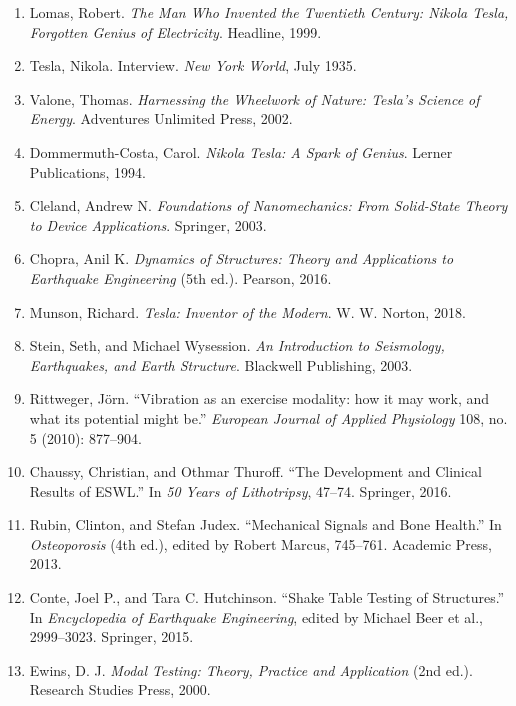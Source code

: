 \documentclass[12pt,a4paper]{article}
\begin{document}
\begin{enumerate}
\item Lomas, Robert. \emph{The Man Who Invented the Twentieth Century: Nikola Tesla, Forgotten Genius of Electricity}. Headline, 1999.

\item Tesla, Nikola. Interview. \emph{New York World}, July 1935.

\item Valone, Thomas. \emph{Harnessing the Wheelwork of Nature: Tesla's Science of Energy}. Adventures Unlimited Press, 2002.

\item Dommermuth-Costa, Carol. \emph{Nikola Tesla: A Spark of Genius}. Lerner Publications, 1994.

\item Cleland, Andrew N. \emph{Foundations of Nanomechanics: From Solid-State Theory to Device Applications}. Springer, 2003.

\item Chopra, Anil K. \emph{Dynamics of Structures: Theory and Applications to Earthquake Engineering} (5th ed.). Pearson, 2016.

\item Munson, Richard. \emph{Tesla: Inventor of the Modern}. W. W. Norton, 2018.

\item Stein, Seth, and Michael Wysession. \emph{An Introduction to Seismology, Earthquakes, and Earth Structure}. Blackwell Publishing, 2003.

\item Rittweger, Jörn. ``Vibration as an exercise modality: how it may work, and what its potential might be.'' \emph{European Journal of Applied Physiology} 108, no. 5 (2010): 877--904.

\item Chaussy, Christian, and Othmar Thuroff. ``The Development and Clinical Results of ESWL.'' In \emph{50 Years of Lithotripsy}, 47--74. Springer, 2016.

\item Rubin, Clinton, and Stefan Judex. ``Mechanical Signals and Bone Health.'' In \emph{Osteoporosis} (4th ed.), edited by Robert Marcus, 745--761. Academic Press, 2013.

\item Conte, Joel P., and Tara C. Hutchinson. ``Shake Table Testing of Structures.'' In \emph{Encyclopedia of Earthquake Engineering}, edited by Michael Beer et al., 2999--3023. Springer, 2015.

\item Ewins, D. J. \emph{Modal Testing: Theory, Practice and Application} (2nd ed.). Research Studies Press, 2000.


\end{enumerate}
\end{document}
